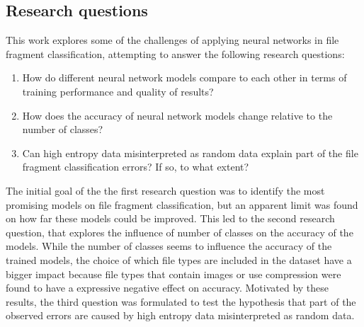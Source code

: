 \subsection{Research questions}
This work explores some of the challenges of applying neural networks in file fragment classification, attempting to answer the following research questions:

\begin{enumerate}[itemindent=\parindent,label=\textbf{Q\arabic*.}]

    \item How do different neural network models compare to each other in terms of training performance and quality of results?
    
    \item How does the accuracy of neural network models change relative to the number of classes?

    \item Can high entropy data misinterpreted as random data explain part of the file fragment classification errors? If so, to what extent?
\end{enumerate}

The initial goal of the the first research question was to identify the most promising models on file fragment classification, but an apparent limit was found on how far these models could be improved. This led to the second research question, that explores the influence of number of classes on the accuracy of the models. While the number of classes seems to influence the accuracy of the trained models, the choice of which file types are included in the dataset have a bigger impact because file types that contain images or use compression were found to have a expressive negative effect on accuracy. Motivated by these results, the third question was formulated to test the hypothesis that part of the observed errors are caused by high entropy data misinterpreted as random data.

